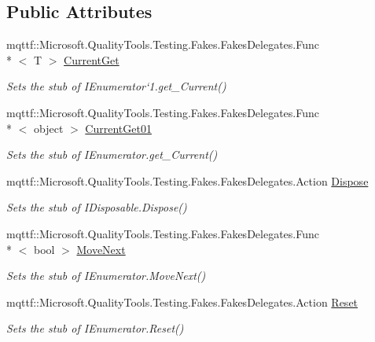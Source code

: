 \subsection*{Public Attributes}
\begin{DoxyCompactItemize}
\item 
mqttf\-::\-Microsoft.\-Quality\-Tools.\-Testing.\-Fakes.\-Fakes\-Delegates.\-Func\\*
$<$ T $>$ \hyperlink{class_system_1_1_collections_1_1_generic_1_1_fakes_1_1_stub_i_enumerator_3_01_t_01_4_a460d071f4c40387d7a871747cad97f95}{Current\-Get}
\begin{DoxyCompactList}\small\item\em Sets the stub of I\-Enumerator`1.get\-\_\-\-Current()\end{DoxyCompactList}\item 
mqttf\-::\-Microsoft.\-Quality\-Tools.\-Testing.\-Fakes.\-Fakes\-Delegates.\-Func\\*
$<$ object $>$ \hyperlink{class_system_1_1_collections_1_1_generic_1_1_fakes_1_1_stub_i_enumerator_3_01_t_01_4_a9508d682fabb1d2f92f1046446b0cc9a}{Current\-Get01}
\begin{DoxyCompactList}\small\item\em Sets the stub of I\-Enumerator.\-get\-\_\-\-Current()\end{DoxyCompactList}\item 
mqttf\-::\-Microsoft.\-Quality\-Tools.\-Testing.\-Fakes.\-Fakes\-Delegates.\-Action \hyperlink{class_system_1_1_collections_1_1_generic_1_1_fakes_1_1_stub_i_enumerator_3_01_t_01_4_ad7c033ddf1bae2981e789ce89fcde924}{Dispose}
\begin{DoxyCompactList}\small\item\em Sets the stub of I\-Disposable.\-Dispose()\end{DoxyCompactList}\item 
mqttf\-::\-Microsoft.\-Quality\-Tools.\-Testing.\-Fakes.\-Fakes\-Delegates.\-Func\\*
$<$ bool $>$ \hyperlink{class_system_1_1_collections_1_1_generic_1_1_fakes_1_1_stub_i_enumerator_3_01_t_01_4_a00066e3dcb0bd7faac252241df8a500a}{Move\-Next}
\begin{DoxyCompactList}\small\item\em Sets the stub of I\-Enumerator.\-Move\-Next()\end{DoxyCompactList}\item 
mqttf\-::\-Microsoft.\-Quality\-Tools.\-Testing.\-Fakes.\-Fakes\-Delegates.\-Action \hyperlink{class_system_1_1_collections_1_1_generic_1_1_fakes_1_1_stub_i_enumerator_3_01_t_01_4_aedba7201d29a9d984e781fe29daafaed}{Reset}
\begin{DoxyCompactList}\small\item\em Sets the stub of I\-Enumerator.\-Reset()\end{DoxyCompactList}\end{DoxyCompactItemize}


